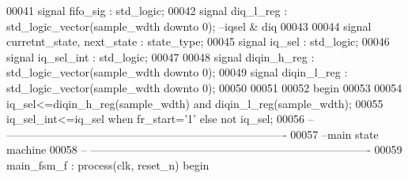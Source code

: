 \begin{DoxyCode}
00041 \textcolor{keywordflow}{signal} \textcolor{vhdlchar}{fifo_sig} \textcolor{vhdlchar}{:} \textcolor{comment}{std\_logic};
00042 \textcolor{keywordflow}{signal} \textcolor{vhdlchar}{diq_l_reg}    \textcolor{vhdlchar}{:} \textcolor{comment}{std\_logic\_vector}\textcolor{vhdlchar}{(}\textcolor{vhdlchar}{sample_wdth} \textcolor{keywordflow}{downto} \textcolor{vhdllogic}{}\textcolor{vhdllogic}{0}\textcolor{vhdlchar}{)};\textcolor{keyword}{    --iqsel & diq}
00043 
00044 \textcolor{keywordflow}{signal} \textcolor{vhdlchar}{curretnt_state}\textcolor{vhdlchar}{,} \textcolor{vhdlchar}{next_state} \textcolor{vhdlchar}{:} \textcolor{vhdlchar}{state_type};
00045 \textcolor{keywordflow}{signal} \textcolor{vhdlchar}{iq_sel}           \textcolor{vhdlchar}{:}  \textcolor{comment}{std\_logic};
00046 \textcolor{keywordflow}{signal} \textcolor{vhdlchar}{iq_sel_int}  \textcolor{vhdlchar}{:} \textcolor{comment}{std\_logic};
00047 
00048 \textcolor{keywordflow}{signal} \textcolor{vhdlchar}{diqin_h_reg}      \textcolor{vhdlchar}{:} \textcolor{comment}{std\_logic\_vector}\textcolor{vhdlchar}{(}\textcolor{vhdlchar}{sample_wdth} \textcolor{keywordflow}{downto} \textcolor{vhdllogic}{}\textcolor{vhdllogic}{0}\textcolor{vhdlchar}{)};
00049 \textcolor{keywordflow}{signal} \textcolor{vhdlchar}{diqin_l_reg}      \textcolor{vhdlchar}{:} \textcolor{comment}{std\_logic\_vector}\textcolor{vhdlchar}{(}\textcolor{vhdlchar}{sample_wdth} \textcolor{keywordflow}{downto} \textcolor{vhdllogic}{}\textcolor{vhdllogic}{0}\textcolor{vhdlchar}{)};
00050 
00051   
00052 \textcolor{vhdlkeyword}{begin}
00053   
00054     \textcolor{vhdlchar}{iq_sel}\textcolor{vhdlchar}{<=}\textcolor{vhdlchar}{diqin_h_reg}\textcolor{vhdlchar}{(}\textcolor{vhdlchar}{sample_wdth}\textcolor{vhdlchar}{)} \textcolor{keywordflow}{and} \textcolor{vhdlchar}{diqin_l_reg}\textcolor{vhdlchar}{(}\textcolor{vhdlchar}{sample_wdth}\textcolor{vhdlchar}{)};
00055     \textcolor{vhdlchar}{iq_sel_int}\textcolor{vhdlchar}{<=}\textcolor{vhdlchar}{iq_sel} \textcolor{keywordflow}{when} \textcolor{vhdlchar}{fr_start}\textcolor{vhdlchar}{=}\textcolor{vhdlchar}{'}\textcolor{vhdllogic}{}\textcolor{vhdllogic}{1}\textcolor{vhdlchar}{'} \textcolor{keywordflow}{else} \textcolor{keywordflow}{not} \textcolor{vhdlchar}{iq_sel};
00056 \textcolor{keyword}{-- ----------------------------------------------------------------------------}
00057 \textcolor{keyword}{--main state machine}
00058 \textcolor{keyword}{-- ----------------------------------------------------------------------------}
00059 main\_fsm\_f : \textcolor{keywordflow}{process}(clk, reset_n) \textcolor{keywordflow}{begin}

\end{DoxyCode}
